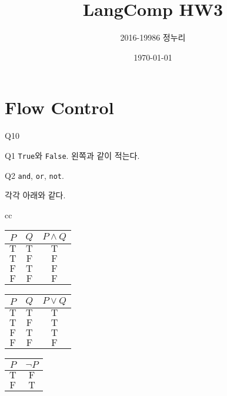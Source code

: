 \documentclass[a4paper,11pt]{scrartcl}
\title{\vspace{-0.5in}LangComp HW3}
\author{\vspace{-15pt}2016-19986 정누리}
\date{\vspace{-5pt}\today}
\begin{document}
\maketitle

\setcounter{section}{1}
\section{Flow Control}

\begin{labeling}{Q10}
  \item[Q1]
  \lstinline{True}와 \lstinline{False}. 왼쪽과 같이 적는다.

  \item[Q2]
  \lstinline{and}, \lstinline{or}, \lstinline{not}.

  \item[Q3] 각각 아래와 같다.
  \begin{center}
    \begin{tabular}{cc}
      \begin{tabular}[t]{ c c c }
        \toprule
        \(P\)          & \(Q\)          & \(P \wedge Q\) \\
        \midrule
        \(\mathrm{T}\) & \(\mathrm{T}\) & \(\mathrm{T}\) \\
        \(\mathrm{T}\) & \(\mathrm{F}\) & \(\mathrm{F}\) \\
        \(\mathrm{F}\) & \(\mathrm{T}\) & \(\mathrm{F}\) \\
        \(\mathrm{F}\) & \(\mathrm{F}\) & \(\mathrm{F}\) \\
        \bottomrule
      \end{tabular}
      \qquad
      \begin{tabular}[t]{ c c c }
        \toprule
        \(P\)          & \(Q\)          & \(P \vee Q\)   \\
        \midrule
        \(\mathrm{T}\) & \(\mathrm{T}\) & \(\mathrm{T}\) \\
        \(\mathrm{T}\) & \(\mathrm{F}\) & \(\mathrm{T}\) \\
        \(\mathrm{F}\) & \(\mathrm{T}\) & \(\mathrm{T}\) \\
        \(\mathrm{F}\) & \(\mathrm{F}\) & \(\mathrm{F}\) \\
        \bottomrule
      \end{tabular}
      \qquad
      \begin{tabular}[t]{ c c }
        \toprule
        \(P\)          & \(\neg P\)     \\
        \midrule
        \(\mathrm{T}\) & \(\mathrm{F}\) \\
        \(\mathrm{F}\) & \(\mathrm{T}\) \\
        \bottomrule
      \end{tabular}
    \end{tabular}
  \end{center}


\end{labeling}
\end{document}
